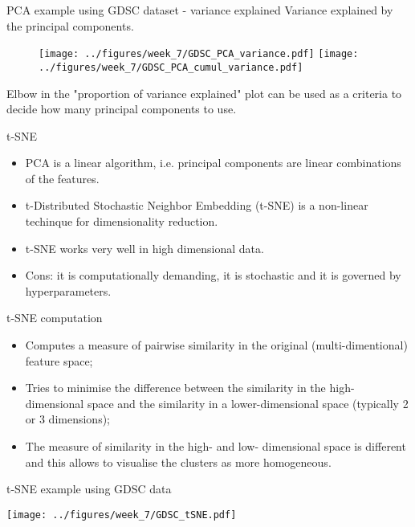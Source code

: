 \documentclass[notes]{beamer}          %
\begin{document}
\begin{frame}{PCA example using GDSC dataset - variance explained}
Variance explained by the principal components.
\begin{figure}
  \texttt{[image: ../figures/week\_7/GDSC\_PCA\_variance.pdf]}  
\endminipage\hfill
{}
  \texttt{[image: ../figures/week\_7/GDSC\_PCA\_cumul\_variance.pdf]}  
\endminipage\hfill
\end{figure}

Elbow in the "proportion of variance explained" plot can be used as a criteria to decide how many principal components to use.
\end{frame}

\begin{frame}{t-SNE}
\begin{itemize}
	\item PCA is a linear algorithm, i.e. principal components are linear combinations of the features.
	\item t-Distributed Stochastic Neighbor Embedding (t-SNE) is a non-linear techinque for dimensionality reduction.
	\item t-SNE works very well in high dimensional data.
	\item Cons: it is computationally demanding, it is stochastic and it is governed by hyperparameters.
\end{itemize}


\end{frame}

\begin{frame}{t-SNE computation}
\begin{itemize}
	\item Computes a measure of pairwise similarity in the original (multi-dimentional) feature space;
	\item Tries to minimise the difference between the similarity in the high-dimensional space and the similarity in a lower-dimensional space (typically 2 or 3 dimensions);
	\item The measure of similarity in the high- and low- dimensional space is different and this allows to visualise the clusters as more homogeneous.
	
	
\end{itemize}
\end{frame}

\begin{frame}{t-SNE example using GDSC data}
\begin{center}
\texttt{[image: ../figures/week\_7/GDSC\_tSNE.pdf]}  
\end{center}
\end{frame}
\end{document}
